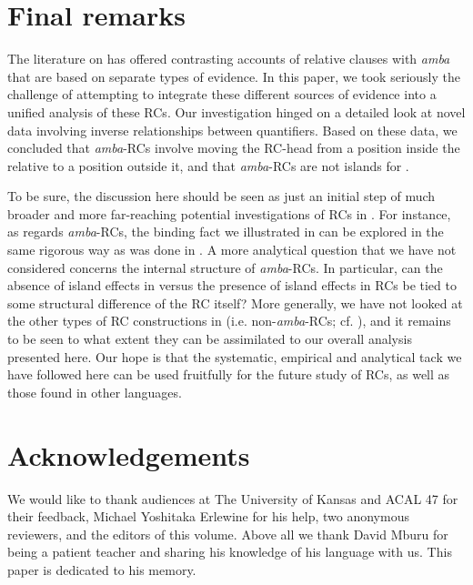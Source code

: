 \documentclass[output=paper,modfonts,nonflat,hidelinks]{langsci/langscibook}
\begin{document}
\section{Final remarks}\label{sec:gould:6}

The literature on  has offered contrasting accounts of  {relative clauses with \textit{amba} } that are based on separate types of evidence. In this paper, we took seriously the challenge of attempting to integrate these different sources of evidence into a unified analysis of these RCs. Our investigation hinged on a detailed look at novel data involving inverse  relationships between quantifiers. Based on these data, we concluded that \textit{amba}{}-RCs involve moving the RC-head from a position inside the relative to a position outside it, and that \textit{amba}{}-RCs are not islands for . 

To be sure, the discussion here should be seen as just an initial step of much broader and more far-reaching potential investigations of RCs in . For instance, as regards \textit{amba}{}-RCs, the binding fact we illustrated in  can be explored in the same rigorous way as was done in . A more analytical question that we have not considered concerns the internal structure of \textit{amba}{}-RCs. In particular, can the absence of island effects in  versus the presence of island effects in  RCs be tied to some structural difference of the RC itself? More generally, we have not looked at the other types of RC constructions in  (i.e. non-\textit{amba}{}-RCs; cf. \citealt{Ngonyani2001}), and it remains to be seen to what extent they can be assimilated to our overall analysis presented here. Our hope is that the systematic, empirical and analytical tack we have followed here can be used fruitfully for the future study of  RCs, as well as those found in other languages.

\section*{Acknowledgements}
We would like to thank audiences at The University of Kansas and ACAL 47 for their feedback, Michael Yoshitaka Erlewine for his help, two anonymous reviewers, and the editors of this volume. Above all we thank David Mburu for being a patient teacher and sharing his knowledge of his language with us. This paper is dedicated to his memory.
\end{document}
